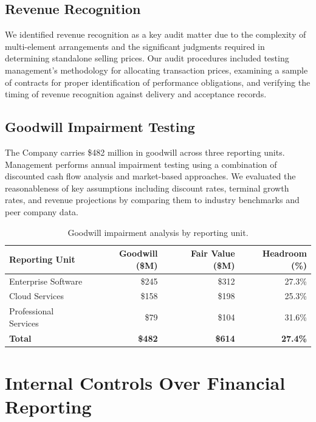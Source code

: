 \documentclass[
    language=english,
    doctype=audit-report,
    institution=none,
]{../../omnilatex}
\begin{document}
\subsection{Revenue Recognition}

We identified revenue recognition as a key audit matter due to the complexity
of multi-element arrangements and the significant judgments required in
determining standalone selling prices. Our audit procedures included testing
management's methodology for allocating transaction prices, examining a
sample of contracts for proper identification of performance obligations, and
verifying the timing of revenue recognition against delivery and acceptance
records.

\subsection{Goodwill Impairment Testing}

The Company carries \$482 million in goodwill across three reporting units.
Management performs annual impairment testing using a combination of
discounted cash flow analysis and market-based approaches. We evaluated the
reasonableness of key assumptions including discount rates, terminal growth
rates, and revenue projections by comparing them to industry benchmarks and
peer company data.

\begin{table}[h]
    \centering
    \begin{tabular}{lrrr}
        \toprule
        \textbf{Reporting Unit} & \textbf{Goodwill (\$M)} & \textbf{Fair Value (\$M)} & \textbf{Headroom (\%)} \\
        \midrule
        Enterprise Software & \$245 & \$312 & 27.3\% \\
        Cloud Services & \$158 & \$198 & 25.3\% \\
        Professional Services & \$79 & \$104 & 31.6\% \\
        \midrule
        \textbf{Total} & \textbf{\$482} & \textbf{\$614} & \textbf{27.4\%} \\
        \bottomrule
    \end{tabular}
    \caption{Goodwill impairment analysis by reporting unit.}
\end{table}

\section{Internal Controls Over Financial Reporting}
\end{document}
